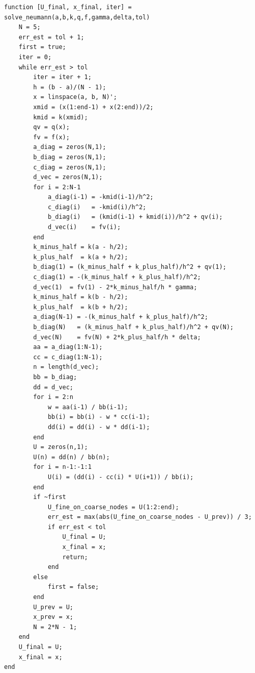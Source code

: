 \documentclass[14pt,a4paper]{extarticle}  %
\numberwithin{equation}{section}
\begin{document}
\begin{verbatim}
function [U_final, x_final, iter] = solve_neumann(a,b,k,q,f,gamma,delta,tol)
    N = 5;
    err_est = tol + 1;
    first = true;
    iter = 0;
    while err_est > tol
        iter = iter + 1;
        h = (b - a)/(N - 1);
        x = linspace(a, b, N)';
        xmid = (x(1:end-1) + x(2:end))/2;
        kmid = k(xmid);
        qv = q(x);
        fv = f(x);
        a_diag = zeros(N,1);
        b_diag = zeros(N,1);
        c_diag = zeros(N,1);
        d_vec = zeros(N,1);
        for i = 2:N-1
            a_diag(i-1) = -kmid(i-1)/h^2;
            c_diag(i)   = -kmid(i)/h^2;
            b_diag(i)   = (kmid(i-1) + kmid(i))/h^2 + qv(i);
            d_vec(i)    = fv(i);
        end
        k_minus_half = k(a - h/2);
        k_plus_half  = k(a + h/2);
        b_diag(1) = (k_minus_half + k_plus_half)/h^2 + qv(1);
        c_diag(1) = -(k_minus_half + k_plus_half)/h^2;
        d_vec(1)  = fv(1) - 2*k_minus_half/h * gamma;
        k_minus_half = k(b - h/2);
        k_plus_half  = k(b + h/2);
        a_diag(N-1) = -(k_minus_half + k_plus_half)/h^2;
        b_diag(N)   = (k_minus_half + k_plus_half)/h^2 + qv(N);
        d_vec(N)    = fv(N) + 2*k_plus_half/h * delta;
        aa = a_diag(1:N-1);
        cc = c_diag(1:N-1);
        n = length(d_vec);
        bb = b_diag;
        dd = d_vec;
        for i = 2:n
            w = aa(i-1) / bb(i-1);
            bb(i) = bb(i) - w * cc(i-1);
            dd(i) = dd(i) - w * dd(i-1);
        end
        U = zeros(n,1);
        U(n) = dd(n) / bb(n);
        for i = n-1:-1:1
            U(i) = (dd(i) - cc(i) * U(i+1)) / bb(i);
        end
        if ~first
            U_fine_on_coarse_nodes = U(1:2:end);
            err_est = max(abs(U_fine_on_coarse_nodes - U_prev)) / 3;
            if err_est < tol
                U_final = U;
                x_final = x;
                return;
            end
        else
            first = false;
        end
        U_prev = U;
        x_prev = x;
        N = 2*N - 1;
    end
    U_final = U;
    x_final = x;
end


\end{verbatim}
\end{document}
